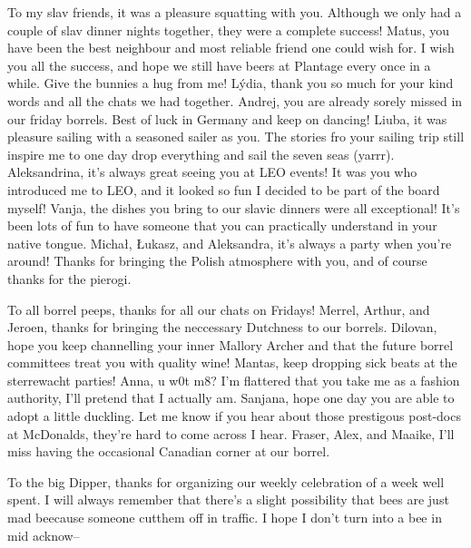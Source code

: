 \begin{thesisacknowledgements}
    To my slav friends, it was a pleasure squatting with you. Although we only had a couple of slav dinner nights together, they were a complete success! Matus, you have been the best neighbour and most reliable friend one could wish for. I wish you all the success, and hope we still have beers at Plantage every once in a while. Give the bunnies a hug from me! L\'ydia, thank you so much for your kind words and all the chats we had together. Andrej, you are already sorely missed in our friday borrels. Best of luck in Germany and keep on dancing! Liuba, it was pleasure sailing with a seasoned sailer as you. The stories fro your sailing trip still inspire me to one day drop everything and sail the seven seas (yarrr). Aleksandrina, it's always great seeing you at LEO events! It was you who introduced me to LEO, and it looked so fun I decided to be part of the board myself! Vanja, the dishes you bring to our slavic dinners were all exceptional! It's been lots of fun to have someone that you can practically understand in your native tongue.  Micha\l{}, \L{}ukasz, and Aleksandra, it's always a party when you're around! Thanks for bringing the Polish atmosphere with you, and of course thanks for the pierogi.

    To all borrel peeps, thanks for all our chats on Fridays! Merrel, Arthur, and Jeroen, thanks for bringing the neccessary Dutchness to our borrels. Dilovan, hope you keep channelling your inner Mallory Archer and that the future borrel committees treat you with quality wine! Mantas, keep dropping sick beats at the sterrewacht parties! Anna, u w0t m8? I'm flattered that you take me as a fashion authority, I'll pretend that I actually am. Sanjana, hope one day you are able to adopt a little duckling. Let me know if you hear about those prestigous post-docs at McDonalds, they're hard to come across I hear. Fraser, Alex, and Maaike, I'll miss having the occasional Canadian corner at our borrel.

    To the big Dipper, thanks for organizing our weekly celebration of a week well spent. I will always remember that there's a slight possibility that bees  are just mad  beecause someone cutthem off in traffic. I hope I don't turn into a bee in mid acknow--


\end{thesisacknowledgements}
